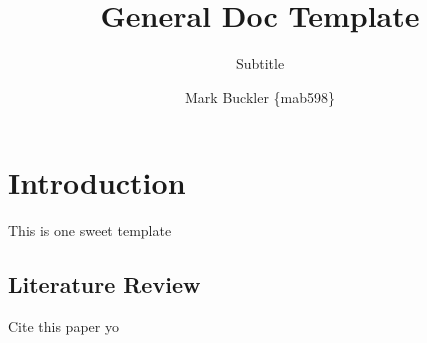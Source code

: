\documentclass{cbxpset}
\title{General Doc Template}
\subtitle{Subtitle}
\author{Mark Buckler \{mab598\}}
\begin{document}
\maketitle

\section{Introduction}
\label{sec:intro}

This is one sweet template

\subsection{Literature Review}

Cite this paper yo \cite{einstein}



\end{document}
